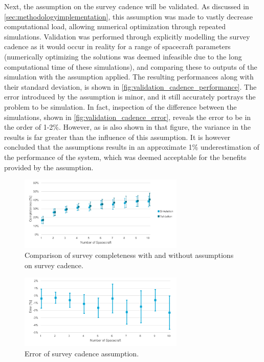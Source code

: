 Next, the assumption on the survey cadence will be validated. As discussed in \autoref{sec:methodologyimplementation}, this assumption was made to vastly decrease computational load, allowing numerical optimization through repeated simulations. Validation was performed through explicitly modelling the survey cadence as it would occur in reality for a range of spacecraft parameters (numerically optimizing the solutions was deemed infeasible due to the long computational time of these simulations), and comparing these to outputs of the simulation with the assumption applied. The resulting performances along with their standard deviation, is shown in \autoref{fig:validation_cadence_performance}. The error introduced by the assumption is minor, and it still accurately portrays the problem to be simulation. In fact, inspection of the difference between the simulations, shown in \autoref{fig:validation_cadence_error}, reveals the error to be in the order of 1-2\%. However, as is also shown in that figure, the variance in the results is far greater than the influence of this assumption. It is however concluded that the assumptions results in an approximate 1\% underestimation of the performance of the system, which was deemed acceptable for the benefits provided by the assumption.

\begin{figure}[htbp]
 \centering
 \includegraphics[width=0.7\textwidth]{img/validation_cadence_performance.pdf}
 \caption{Comparison of survey completeness with and without assumptions on survey cadence.}
 \label{fig:validation_cadence_performance}
\end{figure}

\begin{figure}[htbp]
 \centering
 \includegraphics[width=0.7\textwidth]{img/validation_cadence_error.pdf}
 \caption{Error of survey cadence assumption.}
 \label{fig:validation_cadence_error}
\end{figure}

